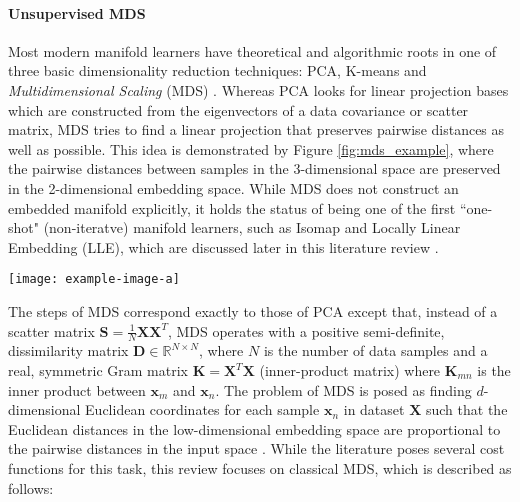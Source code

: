 \paragraph{Unsupervised MDS} 
Most modern manifold learners have theoretical and algorithmic roots in one of three basic dimensionality reduction techniques: PCA, K-means and \textit{Multidimensional Scaling} (MDS) \citep{Torgerson1952MDS}. Whereas PCA looks for linear projection bases which are constructed from the eigenvectors of a data covariance or scatter matrix, MDS tries to find a linear projection that preserves pairwise distances as well as possible. This idea is demonstrated by Figure \ref{fig:mds_example}, where the pairwise distances between samples in the 3-dimensional space are preserved in the 2-dimensional embedding space. While MDS does not construct an embedded manifold explicitly, it holds the status of being one of the first ``one-shot" (non-iteratve) manifold learners, such as Isomap and Locally Linear Embedding (LLE), which are discussed later in this literature review \citep{Kegl2008PrincipalManifoldsTextbook}. 
\begin{center}
	\begin{figure*}[h]
		\centering
		\texttt{[image: example-image-a]}
		\caption[Example of MDS distance preservation.]{Example of MDS distance preservation.}
		\label{fig:mds_example}
	\end{figure*}
\end{center}
The steps of MDS correspond exactly to those of PCA except that, instead of a scatter matrix $\bm{S}=\frac{1}{N}\bm{X}\bm{X}^{T}$, MDS operates with a positive semi-definite, dissimilarity matrix $\bm{D} \in \mathbb{R}^{N \times N}$, where $N$ is the number of data samples and a real, symmetric Gram matrix $\bm{K} = \bm{X}^{T}\bm{X}$ (inner-product matrix) where $\bm{K}_{mn}$ is the inner product between $\bm{x}_{m}$ and $\bm{x}_{n}$.  The problem of MDS is posed as finding $d$-dimensional Euclidean coordinates for each sample $\bm{x}_{n}$ in dataset $\bm{X}$ such that the Euclidean distances in the low-dimensional embedding space are proportional to the pairwise distances in the input space \citep{Thorstensen2009ManifoldThesis,Sorzano2014DRReview}. While the literature poses several cost functions for this task, this review focuses on classical MDS, which is described as follows:


